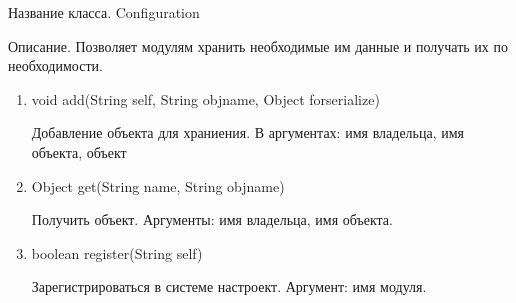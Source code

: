 \documentclass[12pt]{article}
\begin{document}
Название класса. Configuration

Описание. Позволяет модулям хранить необходимые им данные и получать их по необходимости.
\begin{enumerate}
\item void add(String self, String objname, Object forserialize)

Добавление объекта для храниения. В аргументах: имя владельца, имя объекта, объект

\item Object get(String name, String objname)

Получить объект. Аргументы: имя владельца, имя объекта.
\item boolean register(String self)

Зарегистрироваться в системе настроект. Аргумент: имя модуля.
\end{enumerate}
\end{document}
